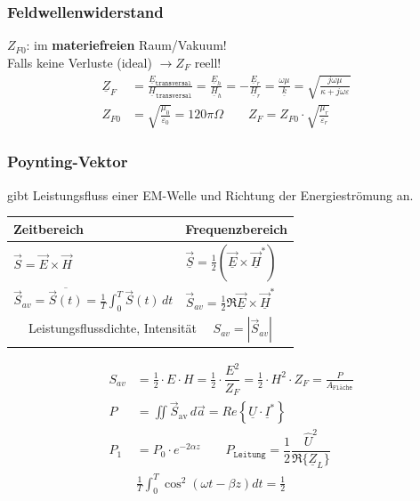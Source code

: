 \subsubsection{Feldwellenwiderstand}
$ Z_{F0} $: im \textbf{materiefreien} Raum/Vakuum!\\
Falls keine Verluste (ideal) $ \rightarrow Z_F $ reell!
\begin{align*}
	\underline{Z}_F & = \frac{\underline{E}_{\texttt{transversal}}}{\underline{H}_{\texttt{transversal}}} = \frac{\underline{E}_h}{\underline{H}_h} = -\frac{\underline{E}_r}{\underline{H}_r} = \frac{\omega \mu}{\underline{k}} = \sqrt{\frac{j\omega\mu}{\kappa+j \omega \varepsilon}}   \\
	Z_{F0}          & = \sqrt{\frac{\mu_0}{\varepsilon_0}} = 120\pi \Omega \qquad  Z_F = Z_{F0} \cdot \sqrt{\frac{\mu_r}{\varepsilon_r}}                                                                                                                                                  &
\end{align*}
\subsubsection{Poynting-Vektor}
gibt Leistungsfluss einer EM-Welle und Richtung der Energieströmung an.\\
\begin{tabular}{|l|l|}
	\hline
	Zeitbereich                                                                        & Frequenzbereich                                                                        \\
	\hline
	$\vec{S} = \vec{E} \times \vec{H}$                                                 & $\vec{\underline{S}} = \frac{1}{2} (\underline{\vec{E}} \times \underline{\vec{H}}^*)$ \\
	$\vec{S}_{av} = \overline{\vec{S}(t)} = \frac{1}{T} \int_{0}^{T} \vec{S}(t) \,dt $ & $\vec{S}_{av} = \frac{1}{2} \Re{\underline{\vec{E}} \times \underline{\vec{H}}^*}$     \\
	\hline
	\multicolumn{2}{|c|}{Leistungsflussdichte, Intensität $\quad S_{av} = |\vec{S}_{av}|$}                                                                                      \\
	\hline
\end{tabular}
\begin{align*}
	S_{av} & =  \frac{1}{2} \cdot E \cdot H
	=  \frac{1}{2} \cdot \dfrac{E^2}{Z_{F}}
	=  \frac{1}{2} \cdot H^2 \cdot Z_{F}
	=  \frac{P}{A_\texttt{Fläche}}                                                                                   \\
	P      & = \iint\vec{S}_{\text{av}}\, d\vec{a}
	= Re\left\{\underline{U}\cdot\underline{I}^*\right\}                                                             \\
	P_1    & = P_0 \cdot e^{-2\alpha z} \qquad P_{\texttt{Leitung}} = \dfrac{1}{2} \dfrac{\hat{U}^2}{\Re\{\underline{Z}_L\}} \\
	& \frac{1}{T} \int_{0}^{T} \cos^2(\omega t - \beta z) dt = \frac{1}{2}
\end{align*}

